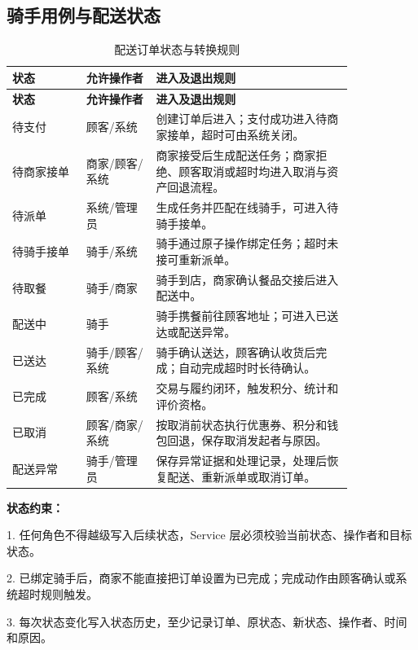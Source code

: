 \subsection{骑手用例与配送状态}



\begin{longtable}{@{}p{0.18\linewidth}p{0.17\linewidth}p{0.48\linewidth}@{}}
\caption{配送订单状态与转换规则}\tabularnewline
\toprule
\textbf{状态} & \textbf{允许操作者} & \textbf{进入及退出规则} \\
\midrule
\endfirsthead
\toprule
\textbf{状态} & \textbf{允许操作者} & \textbf{进入及退出规则} \\
\midrule
\endhead
\bottomrule
\endfoot
待支付 & 顾客/系统 & 创建订单后进入；支付成功进入待商家接单，超时可由系统关闭。 \\
待商家接单 & 商家/顾客/系统 & 商家接受后生成配送任务；商家拒绝、顾客取消或超时均进入取消与资产回退流程。 \\
待派单 & 系统/管理员 & 生成任务并匹配在线骑手，可进入待骑手接单。 \\
待骑手接单 & 骑手/系统 & 骑手通过原子操作绑定任务；超时未接可重新派单。 \\
待取餐 & 骑手/商家 & 骑手到店，商家确认餐品交接后进入配送中。 \\
配送中 & 骑手 & 骑手携餐前往顾客地址；可进入已送达或配送异常。 \\
已送达 & 骑手/顾客/系统 & 骑手确认送达，顾客确认收货后完成；自动完成超时时长待确认。 \\
已完成 & 顾客/系统 & 交易与履约闭环，触发积分、统计和评价资格。 \\
已取消 & 顾客/商家/系统 & 按取消前状态执行优惠券、积分和钱包回退，保存取消发起者与原因。 \\
配送异常 & 骑手/管理员 & 保存异常证据和处理记录，处理后恢复配送、重新派单或取消订单。 \\
\end{longtable}

\textbf{状态约束：}

1. 任何角色不得越级写入后续状态，Service 层必须校验当前状态、操作者和目标状态。

2. 已绑定骑手后，商家不能直接把订单设置为已完成；完成动作由顾客确认或系统超时规则触发。

3. 每次状态变化写入状态历史，至少记录订单、原状态、新状态、操作者、时间和原因。

